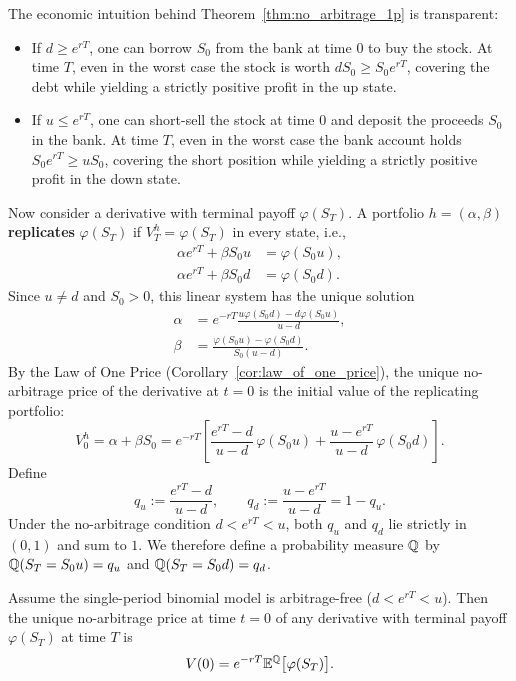 \begin{note}
The economic intuition behind Theorem~\ref{thm:no_arbitrage_1p} is transparent:
\begin{itemize}
    \item If $d \ge e^{rT}$, one can borrow $S_0$ from the bank at time $0$ to buy the stock. At time $T$, even in the worst case the stock is worth $d S_0 \ge S_0 e^{rT}$, covering the debt while yielding a strictly positive profit in the up state.
    \item If $u \le e^{rT}$, one can short-sell the stock at time $0$ and deposit the proceeds $S_0$ in the bank. At time $T$, even in the worst case the bank account holds $S_0 e^{rT} \ge u S_0$, covering the short position while yielding a strictly positive profit in the down state.
\end{itemize}
\end{note}

Now consider a derivative with terminal payoff $\varphi(S_T)$. A portfolio $h = (\alpha, \beta)$ \textbf{replicates} $\varphi(S_T)$ if $V_T^h = \varphi(S_T)$ in every state, i.e.,
\begin{align*}
    \alpha e^{rT} + \beta S_0 u &= \varphi(S_0 u), \\
    \alpha e^{rT} + \beta S_0 d &= \varphi(S_0 d).
\end{align*}
Since $u \neq d$ and $S_0 > 0$, this linear system has the unique solution
\begin{align*}
    \alpha &= e^{-rT} \frac{u \varphi(S_0 d) - d \varphi(S_0 u)}{u - d}, \\
    \beta  &= \frac{\varphi(S_0 u) - \varphi(S_0 d)}{S_0 (u - d)}.
\end{align*}
By the Law of One Price (Corollary~\ref{cor:law_of_one_price}), the unique no-arbitrage price of the derivative at $t = 0$ is the initial value of the replicating portfolio:
\[
    V_0^h = \alpha + \beta S_0 = e^{-rT} \left[ \frac{e^{rT} - d}{u - d}\,\varphi(S_0 u) + \frac{u - e^{rT}}{u - d}\,\varphi(S_0 d) \right].
\]
Define
\[
    q_u := \frac{e^{rT} - d}{u - d}, \qquad q_d := \frac{u - e^{rT}}{u - d} = 1 - q_u.
\]
Under the no-arbitrage condition $d < e^{rT} < u$, both $q_u$ and $q_d$ lie strictly in $(0, 1)$ and sum to $1$. We therefore define a probability measure $\mathbb{Q}$ by $\mathbb{Q}(S_T = S_0 u) = q_u$ and $\mathbb{Q}(S_T = S_0 d) = q_d$.

\begin{theorem}
\label{thm:binomial_pricing_1p}
Assume the single-period binomial model is arbitrage-free ($d < e^{rT} < u$). Then the unique no-arbitrage price at time $t = 0$ of any derivative with terminal payoff $\varphi(S_T)$ at time $T$ is
\[
    V(0) = e^{-rT} \mathbb{E}^{\mathbb{Q}}\bigl[\varphi(S_T)\bigr].
\]
\end{theorem}

